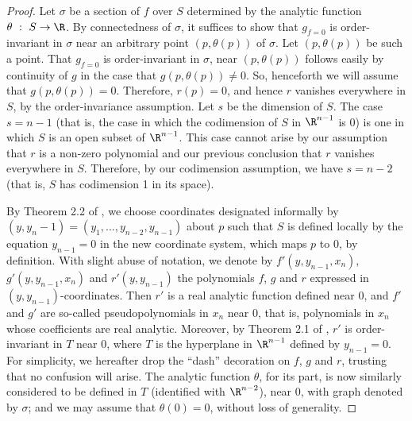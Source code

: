 \documentclass{article}
\begin{document}
\begin{proof}
    Let $\sigma$ be a section of $f$ over $S$ determined by the
    analytic function $\theta~:~S \rightarrow \R$.
    By connectedness of $\sigma$, it suffices to show that
    $g_{f=0}$ is order-invariant in $\sigma$ near an arbitrary point 
    $(p, \theta(p))$ of $\sigma$. Let $(p, \theta(p))$ be such a point.
    That $g_{f=0}$ is order-invariant in $\sigma$, near $(p, \theta(p))$
    follows easily by continuity of $g$ in the case that $g(p, \theta(p)) \neq 0$.
    So, henceforth we will assume that $g(p, \theta(p)) = 0$.
    Therefore, $r(p) = 0$, and hence $r$ vanishes everywhere in
    $S$, by the order-invariance assumption.
    Let $s$ be the dimension of $S$. The case $s = n-1$ (that is, the case in which the codimension of $S$ in $\R^{n-1}$ is 0) is one in which $S$ is an open subset of $\R^{n-1}$.
    This case cannot arise by our assumption that $r$ is a non-zero
    polynomial and our previous conclusion that $r$ vanishes everywhere
    in $S$. Therefore, by our codimension assumption,
    we have $s = n-2$ (that is, $S$ has codimension 1 in its space).

    By Theorem 2.2 of \cite{McCallum1988}, we choose coordinates
    designated informally by $(y,{y_n-1}) =
    (y_1, \ldots, y_{n-2}, y_{n-1})$ about $p$ such that $S$ is defined
    locally by the equation $y_{n-1} = 0$ in the new coordinate system,
    which maps $p$ to $0$, by definition.
    With slight abuse of notation, we denote by $f'(y, y_{n-1}, x_n)$,
    $g'(y, y_{n-1}, x_n)$ and $r'(y,y_{n-1})$ the polynomials
    $f$, $g$ and $r$ expressed in $(y,y_{n-1})$-coordinates.
    Then $r'$ is a real analytic function defined near $0$,
    and $f'$ and $g'$ are so-called pseudopolynomials in $x_n$ near $0$, 
    that is, polynomials in $x_n$ whose coefficients are real analytic.
    Moreover, by Theorem 2.1 of \cite{McCallum1988}, $r'$ is
    order-invariant in $T$ near $0$, where $T$ is the hyperplane in
    $\R^{n-1}$ defined by $y_{n-1} = 0$. For simplicity,
    we hereafter drop the ``dash'' decoration on $f$, $g$ and $r$,
    trusting that no confusion will arise.
    The analytic function $\theta$, for its part, is now similarly considered to be defined in $T$ (identified with $\R^{n-2}$), 
    near $0$, with graph 
    denoted by $\sigma$; and we may assume that
    $\theta(0) = 0$, without loss of generality.


\end{proof}
\end{document}

